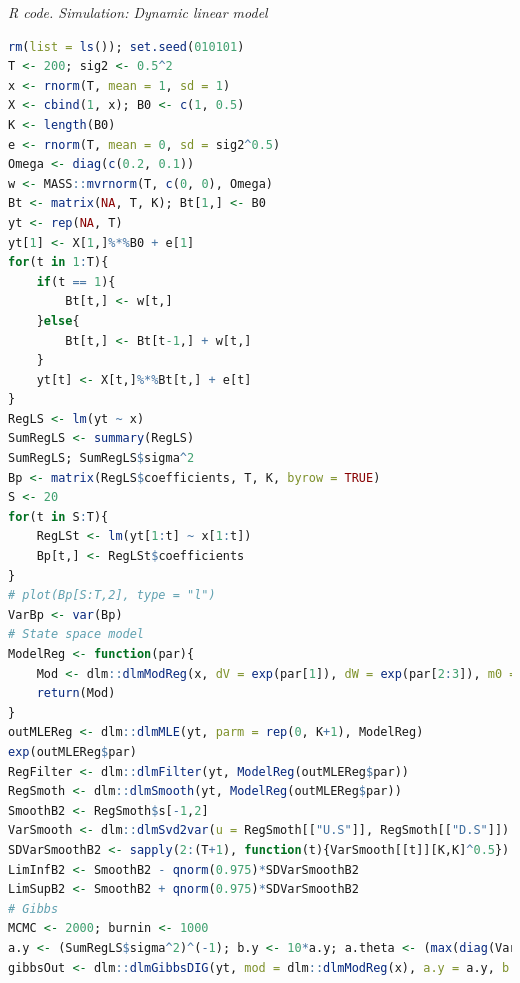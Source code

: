 \begin{tcolorbox}[enhanced,width=4.67in,center upper,
	fontupper=\large\bfseries,drop shadow southwest,sharp corners]
	\textit{R code. Simulation: Dynamic linear model}
	\begin{VF}
		\begin{lstlisting}[language=R]
rm(list = ls()); set.seed(010101)
T <- 200; sig2 <- 0.5^2
x <- rnorm(T, mean = 1, sd = 1) 
X <- cbind(1, x); B0 <- c(1, 0.5)
K <- length(B0)
e <- rnorm(T, mean = 0, sd = sig2^0.5)
Omega <- diag(c(0.2, 0.1))
w <- MASS::mvrnorm(T, c(0, 0), Omega)
Bt <- matrix(NA, T, K); Bt[1,] <- B0
yt <- rep(NA, T) 
yt[1] <- X[1,]%*%B0 + e[1]
for(t in 1:T){
	if(t == 1){
		Bt[t,] <- w[t,]
	}else{
		Bt[t,] <- Bt[t-1,] + w[t,]
	}
	yt[t] <- X[t,]%*%Bt[t,] + e[t]
}
RegLS <- lm(yt ~ x)
SumRegLS <- summary(RegLS)
SumRegLS; SumRegLS$sigma^2  
Bp <- matrix(RegLS$coefficients, T, K, byrow = TRUE)
S <- 20
for(t in S:T){
	RegLSt <- lm(yt[1:t] ~ x[1:t])
	Bp[t,] <- RegLSt$coefficients 
}
# plot(Bp[S:T,2], type = "l")
VarBp <- var(Bp)
# State space model
ModelReg <- function(par){
	Mod <- dlm::dlmModReg(x, dV = exp(par[1]), dW = exp(par[2:3]), m0 = RegLS$coefficients,	C0 = VarBp)
	return(Mod)
}
outMLEReg <- dlm::dlmMLE(yt, parm = rep(0, K+1), ModelReg)
exp(outMLEReg$par)
RegFilter <- dlm::dlmFilter(yt, ModelReg(outMLEReg$par))
RegSmoth <- dlm::dlmSmooth(yt, ModelReg(outMLEReg$par))
SmoothB2 <- RegSmoth$s[-1,2]
VarSmooth <- dlm::dlmSvd2var(u = RegSmoth[["U.S"]], RegSmoth[["D.S"]])
SDVarSmoothB2 <- sapply(2:(T+1), function(t){VarSmooth[[t]][K,K]^0.5}) 
LimInfB2 <- SmoothB2 - qnorm(0.975)*SDVarSmoothB2
LimSupB2 <- SmoothB2 + qnorm(0.975)*SDVarSmoothB2
# Gibbs
MCMC <- 2000; burnin <- 1000
a.y <- (SumRegLS$sigma^2)^(-1); b.y <- 10*a.y; a.theta <- (max(diag(VarBp)))^(-1); b.theta <- 10*a.theta 
gibbsOut <- dlm::dlmGibbsDIG(yt, mod = dlm::dlmModReg(x), a.y = a.y, b.y = b.y, a.theta = a.theta, b.theta = b.theta, n.sample = MCMC, thin = 5, save.states = TRUE)
\end{lstlisting}
	\end{VF}
\end{tcolorbox} 
 
